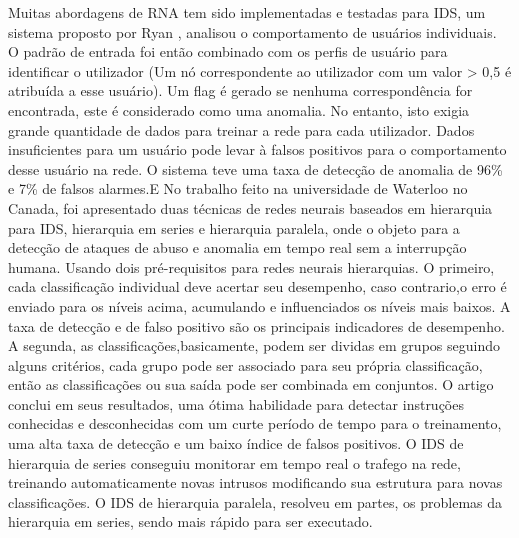 Muitas abordagens de RNA tem sido implementadas e testadas para IDS, um sistema proposto por Ryan \cite{Ryan}, analisou  o comportamento de usuários individuais. O padrão de entrada foi então combinado com os perfis de usuário para identificar o utilizador (Um nó correspondente ao utilizador com um valor > 0,5 é atribuída a esse usuário). Um flag é gerado se nenhuma correspondência for encontrada,  este é considerado como uma anomalia. No entanto, isto exigia grande quantidade de dados para treinar a rede para cada utilizador. Dados insuficientes para um usuário pode levar à falsos positivos para o comportamento desse usuário na rede. O sistema teve uma taxa de detecção de anomalia de 96\% e 7\% de falsos alarmes.E No trabalho feito na universidade de Waterloo no Canada\cite{Chunlin}, foi apresentado duas técnicas de redes neurais baseados em hierarquia para IDS, hierarquia em series e hierarquia paralela, onde o objeto para a detecção de ataques de abuso e anomalia em tempo real sem a interrupção humana.
Usando dois pré-requisitos para redes neurais hierarquias. O primeiro, cada classificação individual deve acertar seu desempenho, caso contrario,o erro é enviado para os níveis acima, acumulando e influenciados os níveis mais baixos. A taxa de detecção e de falso positivo são os principais indicadores de desempenho. 
A segunda, as classificações,basicamente, podem ser dividas em grupos seguindo alguns critérios, cada grupo pode ser associado para seu própria classificação, então as classificações ou sua saída pode ser combinada em conjuntos.
O artigo conclui em seus resultados, uma ótima habilidade para detectar instruções conhecidas e desconhecidas com um curte período de tempo para o treinamento, uma alta taxa de detecção e um baixo índice de falsos positivos.
O IDS de hierarquia de series conseguiu monitorar em tempo real o trafego na rede, treinando automaticamente novas intrusos modificando sua estrutura para novas classificações. O IDS de hierarquia paralela, resolveu em partes, os problemas da hierarquia em series, sendo mais rápido para ser executado.

